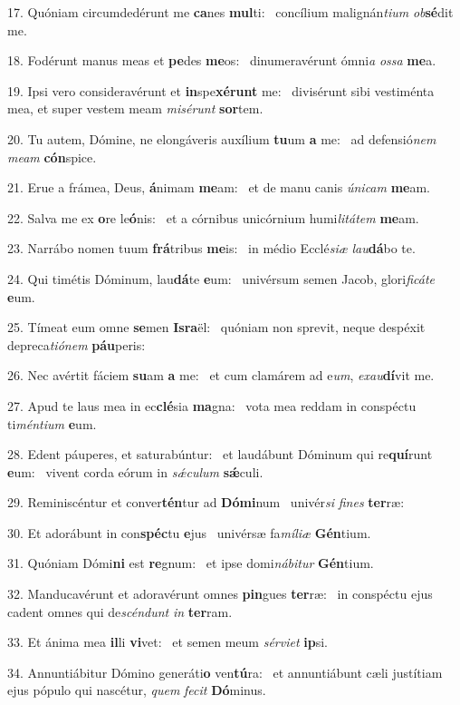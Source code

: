 17. Quóniam circumdedérunt me \textbf{ca}nes \textbf{mul}ti: \ast\  concílium malignán\textit{ti}\textit{um} \textit{ob}\textbf{sé}dit me.\

18. Fodérunt manus meas et \textbf{pe}des \textbf{me}os: \ast\  dinumeravérunt ómni\textit{a} \textit{os}\textit{sa} \textbf{me}a.\

19. Ipsi vero consideravérunt et \textbf{in}spe\textbf{xé}\textbf{runt} me: \ast\  divisérunt sibi vestiménta mea, et super vestem meam \textit{mi}\textit{sé}\textit{runt} \textbf{sor}tem.\

20. Tu autem, Dómine, ne elongáveris auxílium \textbf{tu}um \textbf{a} me: \ast\  ad defensió\textit{nem} \textit{me}\textit{am} \textbf{cón}spice.\

21. Erue a frámea, Deus, \textbf{á}nimam \textbf{me}am: \ast\  et de manu canis \textit{ú}\textit{ni}\textit{cam} \textbf{me}am.\

22. Salva me ex \textbf{o}re le\textbf{ó}nis: \ast\  et a córnibus unicórnium humi\textit{li}\textit{tá}\textit{tem} \textbf{me}am.\

23. Narrábo nomen tuum \textbf{frá}tribus \textbf{me}is: \ast\  in médio Ecclé\textit{si}\textit{æ} \textit{lau}\textbf{dá}bo te.\

24. Qui timétis Dóminum, lau\textbf{dá}te \textbf{e}um: \ast\  univérsum semen Jacob, glori\textit{fi}\textit{cá}\textit{te} \textbf{e}um.\

25. Tímeat eum omne \textbf{se}men \textbf{Is}\textbf{ra}ël: \ast\  quóniam non sprevit, neque despéxit depreca\textit{ti}\textit{ó}\textit{nem} \textbf{páu}peris:\

26. Nec avértit fáciem \textbf{su}am \textbf{a} me: \ast\  et cum clamárem ad e\textit{um}, \textit{ex}\textit{au}\textbf{dí}vit me.\

27. Apud te laus mea in ec\textbf{clé}sia \textbf{ma}gna: \ast\  vota mea reddam in conspéctu ti\textit{mén}\textit{ti}\textit{um} \textbf{e}um.\

28. Edent páuperes, et saturabúntur: \dag\  et laudábunt Dóminum qui re\textbf{quí}runt \textbf{e}um: \ast\  vivent corda eórum in \textit{sǽ}\textit{cu}\textit{lum} \textbf{sǽ}culi.\

29. Reminiscéntur et conver\textbf{tén}tur ad \textbf{Dó}\textbf{mi}num \ast\  univér\textit{si} \textit{fi}\textit{nes} \textbf{ter}ræ:\

30. Et adorábunt in con\textbf{spéc}tu \textbf{e}jus \ast\  univérsæ fa\textit{mí}\textit{li}\textit{æ} \textbf{Gén}tium.\

31. Quóniam Dómi\textbf{ni} est \textbf{re}gnum: \ast\  et ipse domi\textit{ná}\textit{bi}\textit{tur} \textbf{Gén}tium.\

32. Manducavérunt et adoravérunt omnes \textbf{pin}gues \textbf{ter}ræ: \ast\  in conspéctu ejus cadent omnes qui de\textit{scén}\textit{dunt} \textit{in} \textbf{ter}ram.\

33. Et ánima mea \textbf{il}li \textbf{vi}vet: \ast\  et semen meum \textit{sér}\textit{vi}\textit{et} \textbf{ip}si.\

34. Annuntiábitur Dómino generáti\textbf{o} ven\textbf{tú}ra: \ast\  et annuntiábunt cæli justítiam ejus pópulo qui nascétur, \textit{quem} \textit{fe}\textit{cit} \textbf{Dó}minus.\

